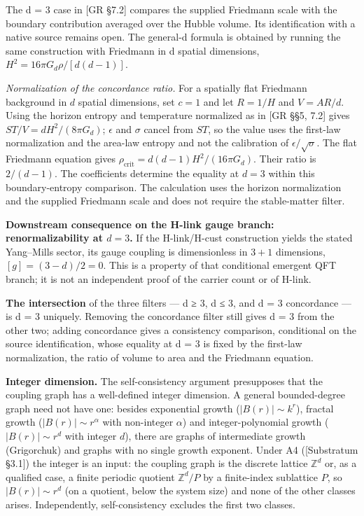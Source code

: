 \documentclass[
]{article}
\begin{document}
The d = 3 case in {[}GR §7.2{]} compares the supplied Friedmann scale
with the boundary contribution averaged over the Hubble volume. Its
identification with a native source remains open. The general-d formula
is obtained by running the same construction with Friedmann in d spatial
dimensions, \(H^2 = 16\pi G_d \rho / [d(d-1)]\).

\emph{Normalization of the concordance ratio.} For a spatially flat
Friedmann background in \(d\) spatial dimensions, set \(c=1\) and let
\(R=1/H\) and \(V=AR/d\). Using the horizon entropy and temperature
normalized as in {[}GR §§5, 7.2{]} gives \(ST/V=dH^2/(8\pi G_d)\);
\(\epsilon\) and \(\sigma\) cancel from \(ST\), so the value uses the
first-law normalization and the area-law entropy and not the calibration
of \(\epsilon/\sqrt{\sigma}\). The flat Friedmann equation gives
\(\rho_{\mathrm{crit}}=d(d-1)H^2/(16\pi G_d)\). Their ratio is
\(2/(d-1)\). The coefficients determine the equality at \(d=3\) within
this boundary-entropy comparison. The calculation uses the horizon
normalization and the supplied Friedmann scale and does not require the
stable-matter filter.

\textbf{Downstream consequence on the H-link gauge branch:
renormalizability at \(d=3\).} If the H-link/H-cust construction yields
the stated Yang--Mills sector, its gauge coupling is dimensionless in
\(3+1\) dimensions, \([g]=(3-d)/2=0\). This is a property of that
conditional emergent QFT branch; it is not an independent proof of the
carrier count or of H-link.

\textbf{The intersection} of the three filters --- d ≥ 3, d ≤ 3, and d =
3 concordance --- is d = 3 uniquely. Removing the concordance filter
still gives d = 3 from the other two; adding concordance gives a
consistency comparison, conditional on the source identification, whose
equality at d = 3 is fixed by the first-law normalization, the ratio of
volume to area and the Friedmann equation.

\textbf{Integer dimension.} The self-consistency argument presupposes
that the coupling graph has a well-defined integer dimension. A general
bounded-degree graph need not have one: besides exponential growth
(\(|B(r)| \sim k^r\)), fractal growth (\(|B(r)| \sim r^\alpha\) with
non-integer \(\alpha\)) and integer-polynomial growth
(\(|B(r)| \sim r^d\) with integer \(d\)), there are graphs of
intermediate growth (Grigorchuk) and graphs with no single growth
exponent. Under A4 ({[}Substratum §3.1{]}) the integer is an input: the
coupling graph is the discrete lattice \(\mathbb Z^d\) or, as a
qualified case, a finite periodic quotient \(\mathbb Z^d/P\) by a
finite-index sublattice \(P\), so \(|B(r)| \sim r^d\) (on a quotient,
below the system size) and none of the other classes arises.
Independently, self-consistency excludes the first two classes.
\end{document}
